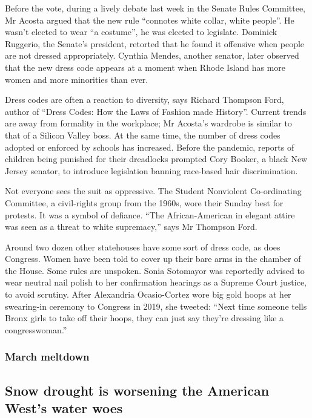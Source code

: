 \documentclass{article}
\begin{document}
Before the vote, during a lively debate last week in the Senate Rules Committee, Mr Acosta argued that the new rule ``connotes white collar, white people''. He wasn't elected to wear ``a costume'', he was elected to legislate. Dominick Ruggerio, the Senate's president, retorted that he found it offensive when people are not dressed appropriately. Cynthia Mendes, another senator, later observed that the new dress code appears at a moment when Rhode Island has more women and more minorities than ever. 

Dress codes are often a reaction to diversity, says Richard Thompson Ford, author of ``Dress Codes: How the Laws of Fashion made History''. Current trends are away from formality in the workplace; Mr Acosta's wardrobe is similar to that of a Silicon Valley boss. At the same time, the number of dress codes adopted or enforced by schools has increased. Before the pandemic, reports of children being punished for their dreadlocks prompted Cory Booker, a black New Jersey senator, to introduce legislation banning race-based hair discrimination. 

Not everyone sees the suit as oppressive. The Student Nonviolent Co-ordinating Committee, a civil-rights group from the 1960s, wore their Sunday best for protests. It was a symbol of defiance. ``The African-American in elegant attire was seen as a threat to white supremacy,'' says Mr Thompson Ford. 

Around two dozen other statehouses have some sort of dress code, as does Congress. Women have been told to cover up their bare arms in the chamber of the House. Some rules are unspoken. Sonia Sotomayor was reportedly advised to wear neutral nail polish to her confirmation hearings as a Supreme Court justice, to avoid scrutiny. After Alexandria Ocasio-Cortez wore big gold hoops at her swearing-in ceremony to Congress in 2019, she tweeted: ``Next time someone tells Bronx girls to take off their hoops, they can just say they're dressing like a congresswoman.'' 
\clearpage
\subsubsection{March meltdown }
\subsection{Snow drought is worsening the American West's water woes }
\end{document}
